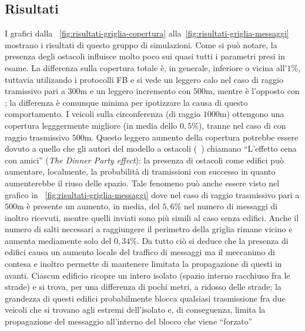 \subsection{Risultati}\label{sec:configurazione-griglia-risultati}
I grafici dalla \figurename~\ref{fig:risultati-griglia-copertura} alla~\ref{fig:risultati-griglia-messaggi}\footnotemark
{}
mostrano i risultati di questo gruppo di simulazioni.
Come si può notare, la presenza degli ostacoli influisce molto poco sui quasi tutti i parametri presi in esame.
La differenza sulla copertura totale è, in generale, inferiore o vicina all'$1\%$, tuttavia utilizando i protocolli FB e \statica{} si vede
un leggero calo nel caso di raggio tramissivo pari a $300$m e un leggero incremento con $500$m, mentre
è l'opposto con \staticb{}; la differenza è comunque minima per ipotizzare la causa di questo comportamento. %
I veicoli sulla circonferenza (di raggio $1000$m) ottengono una copertura legggermente migliore
(in media dello $0,5\%$), tranne nel caso di \staticb{} con raggio trasmissivo $500$m.
Questo leggero aumento della copertura potrebbe essere dovuto a quello che gli autori del modello a ostacoli (~\cite{Carpenter:2015:OMI:2756509.2756512})
chiamano ``L'effetto cena con amici'' (\textit{The Dinner Party effect}): la presenza di ostacoli come edifici
può aumentare, localmente, la probabilità di tramissioni con successo in quanto aumenterebbe il riuso delle spazio.
Tale fenomeno può anche essere visto nel grafico in \figurename~\ref{fig:risultati-griglia-messaggi}
dove nel caso di raggio trasmissivo pari a $500$m è presente un aumento, in media, del $5,6$\%
nel numero di messaggi di inoltro ricevuti, mentre quelli inviati sono più simili al caso senza edifici.
Anche il numero di salti necessari a raggiungere il perimetro della griglia rimane vicino
e aumenta mediamente solo del $0,34\%$.
Da tutto ciò si deduce che la presenza di edifici causa un aumento locale del traffico di messaggi
ma il meccanimo di contesa e inoltro permette di mantenere limitata la propagazione di questi in avanti. %
Ciascun edificio ricopre un intero isolato (spazio interno racchiuso fra le strade) e si trova, per una differenza di pochi metri,
a ridosso delle strade;
la grandezza di questi edifici probabilmente blocca qualsiasi trasmissione fra due veicoli che si trovano
agli estremi dell'isolato e, di conseguenza, limita la propagazione del messaggio all'interno del blocco  che viene ``forzato''
